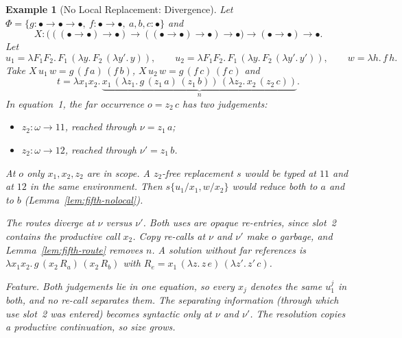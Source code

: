 \documentclass[10pt,a4paper]{article}
\theoremstyle{plain}%
\newtheorem{example}[theorem]{Example}
\begin{document}
\begin{example}[No Local Replacement: Divergence]\label{ex:ex-clash}
Let $\Phi = \{g : \bullet\to\bullet\to\bullet,\ f : \bullet\to\bullet,\ a,b,c : \bullet\}$ and
\[
X : \big(((\bullet\to\bullet)\to\bullet) \to ((\bullet\to\bullet)\to\bullet) \to \bullet\big) \to (\bullet\to\bullet) \to \bullet .
\]
Let
\[
u_1 = \lambda F_1F_2.\,F_1\,(\lambda y.\,F_2\,(\lambda y'.\,y)),
\qquad
u_2 = \lambda F_1F_2.\,F_1\,(\lambda y.\,F_2\,(\lambda y'.\,y')),
\qquad
w = \lambda h.\,f\,h .
\]
Take $X\,u_1\,w = g\,(f\,a)\,(f\,b)$, $X\,u_2\,w = g\,(f\,c)\,(f\,c)$ and
\[
t = \lambda x_1x_2.\,\underbrace{x_1\,(\lambda z_1.\,g\,(z_1\,a)\,(z_1\,b))\,(\lambda z_2.\,x_2\,(z_2\,c))}_{n}.
\]
In equation~1, the far occurrence $o = z_2\,c$ has two judgements:
\begin{itemize}
\item $z_2 : \omega \to 11$, reached through $\nu = z_1\,a$;
\item $z_2 : \omega \to 12$, reached through $\nu' = z_1\,b$.
\end{itemize}
At $o$ only $x_1, x_2, z_2$ are in scope.
A $z_2$-free replacement $s$ would be typed at $11$ and at $12$ in the same environment.
Then $s\{u_1/x_1, w/x_2\}$ would reduce both to $a$ and to $b$ (Lemma~\ref{lem:fifth-nolocal}).

The routes diverge at $\nu$ versus $\nu'$.
Both uses are opaque re-entries, since slot~2 contains the productive call $x_2$.
Copy re-calls at $\nu$ and $\nu'$ make $o$ garbage, and Lemma~\ref{lem:fifth-route} removes $n$.
A solution without far references is $\lambda x_1x_2.\,g\,(x_2\,R_a)\,(x_2\,R_b)$ with $R_e = x_1\,(\lambda z.\,z\,e)\,(\lambda z'.\,z'\,c)$.

\emph{Feature.}
Both judgements lie in one equation, so every $x_j$ denotes the same $u_1^j$ in both, and no re-call separates them.
The separating information (through which use slot~2 was entered) becomes syntactic only at $\nu$ and $\nu'$.
The resolution copies a productive continuation, so size grows.
\end{example}
\end{document}
